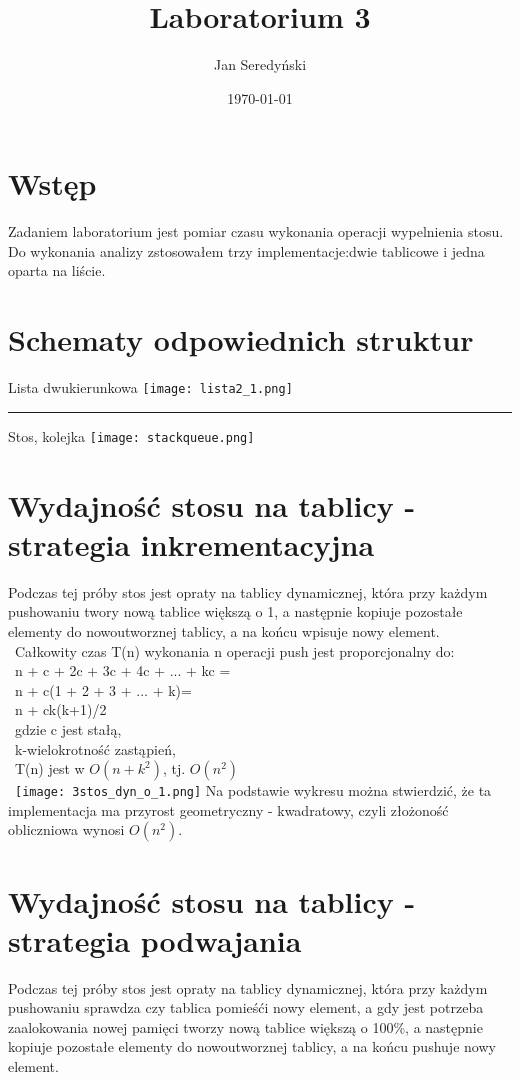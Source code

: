 \documentclass[11pt]{article}
\begin{document}
\title{Laboratorium 3}
\author{Jan Seredyński}
\date{\today}
\maketitle

\section{Wstęp}
Zadaniem laboratorium jest pomiar czasu wykonania operacji wypelnienia stosu. Do wykonania analizy zstosowałem trzy implementacje:dwie tablicowe i jedna oparta na liście.


\section{Schematy odpowiednich struktur}

Lista dwukierunkowa
\texttt{[image: lista2\_1.png]} 
\par\vspace{\baselineskip}
\hrule
\par\vspace{\baselineskip}
Stos, kolejka
\texttt{[image: stackqueue.png]} 
\newpage

\section{Wydajność stosu na tablicy - strategia inkrementacyjna}
Podczas tej próby stos jest opraty na tablicy dynamicznej, która przy każdym pushowaniu twory nową tablice większą o 1, a następnie kopiuje pozostałe elementy do nowoutworznej tablicy, a na końcu wpisuje nowy element.\\\
Całkowity czas T(n) wykonania n operacji push jest proporcjonalny do: \\\
n + c + 2c + 3c + 4c + ... + kc =\\\
n + c(1 + 2 + 3 + ... + k)=\\\
n + ck(k+1)/2\\\
gdzie c jest stałą,\\\
k-wielokrotność zastąpień,\\\
T(n) jest w $O(n+k^2)$, tj. $O(n^2)$\\\
\texttt{[image: 3stos\_dyn\_o\_1.png]}
Na podstawie wykresu można stwierdzić, że ta implementacja ma przyrost geometryczny - kwadratowy, czyli złożoność obliczniowa wynosi $O(n^2)$.
\section{Wydajność stosu na tablicy - strategia podwajania}
Podczas tej próby stos jest opraty na tablicy dynamicznej, która przy każdym pushowaniu sprawdza czy tablica pomieśći nowy element, a gdy jest potrzeba zaalokowania nowej pamięci tworzy nową tablice większą o 100\%, a następnie kopiuje pozostałe elementy do nowoutworznej tablicy, a na końcu pushuje nowy element.\\\
\end{document}
